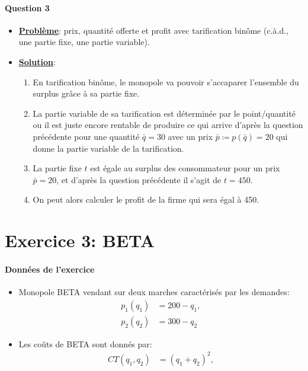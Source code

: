       \begin{frame}
        [allowframebreaks]{\insertsection}
        \framesubtitle{Question 3\\}
        \begin{itemize}
          \item \textbf{\underline{Problème}}:  prix, quantité offerte et profit avec  tarification binôme
           (c.à.d., une partie fixe, une partie variable).

    \item \textbf{\underline{Solution}}: 
  \begin{enumerate}[$\cdot$]
   \item En tarification binôme, le monopole va pouvoir s’accaparer l’ensemble du surplus grâce à sa partie fixe.
   \item La partie variable de sa tarification est déterminée par le point/quantité ou il est juste encore rentable de 
   produire ce qui arrive d'après la question précédente pour une quantité $\bar{q} = 30$ avec un prix $\bar{p}\coloneqq p(\bar{q}) = 20$ 
   qui donne la partie variable de la tarification.
   \item La partie fixe $t$ est égale au surplus des consommateur pour un prix $\bar{p} = 20$, et d'après la question précédente il s'agit de $t = 450$. 
   \item On peut alors calculer le profit de la firme qui sera égal à 450.
  \end{enumerate}
\end{itemize}
  \end{frame}
   
  \section{Exercice 3: BETA }
\frame{\sectionpage}
\begin{frame}
[allowframebreaks]{\insertsection}
\framesubtitle{Données de l'exercice \\}
\begin{itemize}
    \item Monopole BETA vendant sur deux marches caractérisés par les demandes:
    \begin{align}
   p_1(q_1) & = 200-q_1,\\
   p_2(q_2) & = 300-q_2
    \label{eq7}
    \end{align}
   \item Les coûts de BETA sont donnés par:
   \begin{align}
     CT(q_1, q_2)&=(q_1+q_2)^2,
     \label{eq8}
   \end{align}
\end{itemize}
    \end{frame}

